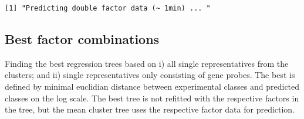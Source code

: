 \documentclass[]{article}
\newenvironment{Shaded}{\begin{snugshade}}{\end{snugshade}}
\newcommand{\KeywordTok}[1]{\textcolor[rgb]{0.13,0.29,0.53}{\textbf{{#1}}}}
\newcommand{\DataTypeTok}[1]{\textcolor[rgb]{0.13,0.29,0.53}{{#1}}}
\newcommand{\DecValTok}[1]{\textcolor[rgb]{0.00,0.00,0.81}{{#1}}}
\newcommand{\StringTok}[1]{\textcolor[rgb]{0.31,0.60,0.02}{{#1}}}
\newcommand{\CommentTok}[1]{\textcolor[rgb]{0.56,0.35,0.01}{\textit{{#1}}}}
\newcommand{\OtherTok}[1]{\textcolor[rgb]{0.56,0.35,0.01}{{#1}}}
\newcommand{\NormalTok}[1]{{#1}}
\begin{document}
\begin{verbatim}
[1] "Predicting double factor data (~ 1min) ... "
\end{verbatim}

\begin{Shaded}
\end{Shaded}

\subsection{Best factor combinations}\label{best-factor-combinations}

Finding the best regression trees based on i) all single representatives
from the clusters; and ii) single representatives only consisting of
gene probes. The best is defined by minimal euclidian distance between
experimental classes and predicted classes on the log scale. The best
tree is not refitted with the respective factors in the tree, but the
mean cluster tree uses the respective factor data for prediction.
\end{document}
